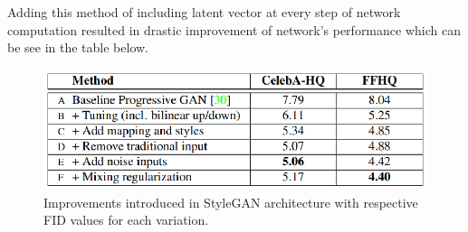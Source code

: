 \documentclass[11pt,a4paper,openany]{book}
\begin{document}
\noindent Adding this method of including latent vector at every step of network computation resulted in drastic improvement of network's performance which can be see in the table below.

\begin{figure}[ht!]
    \centering
    \includegraphics[scale=1.2]{figs/frechet-distance.eps}
    \caption{Improvements introduced in StyleGAN architecture with respective FID values for each variation. \cite{stylegan}}\label{Fig:STYLEGAN}
\end{figure}







\end{document}
